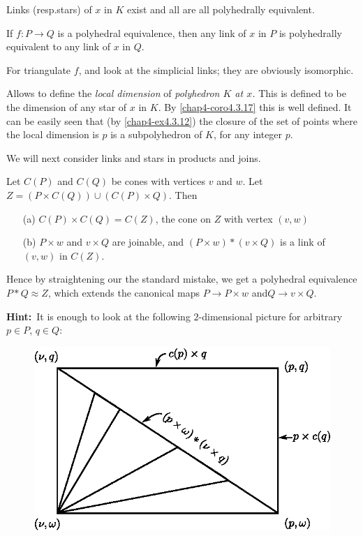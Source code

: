 \setcounter{proposition}{16}
\begin{corollary}\label{chap4-coro4.3.17}
Links (resp.\@ stars) of $x$ in $K$ exist and all are all polyhedrally equivalent. 
\end{corollary}

\begin{proposition}\label{chap4-prop4.3.18}
If $f:P\to Q$ is a polyhedral equivalence, then any link of $x$ in $P$ is polyhedrally equivalent to any link of $x$ in $Q$.

For triangulate $f$, and look at the simplicial links; they are obviously isomorphic.
\end{proposition}

\medskip
{}
Allows to define the {\em local dimension} of {\em polyhedron $K$ at $x$.} This is defined to be the dimension of any star of $x$ in $K$. By \ref{chap4-coro4.3.17} this is well defined. It can be easily seen that (by \ref{chap4-ex4.3.12}) the closure of the set of points where the local dimension is $p$ is a subpolyhedron of $K$, for any integer $p$.

We will next consider links and stars in products and joins.

\begin{ex}\label{chap4-ex4.3.19}
Let $C(P)$ and $C(Q)$ be cones with vertices $v$ and $w$. Let $Z=(P\times C(Q))\cup (C(P)\times Q)$. Then 
\begin{itemize}
\item[(a)] $C(P)\times C(Q)=C(Z)$, the cone on $Z$ with vertex $(v,w)$

\item[(b)] $P\times w$ and $v\times Q$ are joinable, and $(P\times w)\ast (v\times Q)$ is a link of $(v,w)$ in $C(Z)$.
\end{itemize}

Hence by straightening our the standard mistake, we get a polyhedral equivalence $P\ast Q\approx Z$, which extends the canonical maps $P\to P\times w$ and\pageoriginale $Q\to v\times Q$.
\end{ex}

\noindent
{\bf Hint:}~It is enough to look at the following $2$-dimensional picture for arbitrary $p\in P$, $q\in Q$:
\begin{figure}[H]
\centering
\includegraphics{figure/fig11.eps}
\end{figure}

